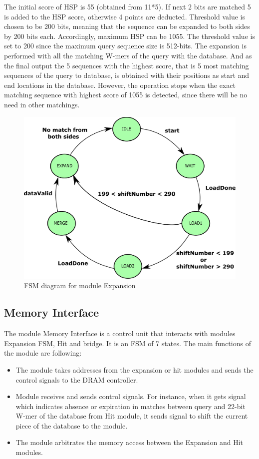 The initial score of HSP is 55 (obtained from 11*5). 
If next 2 bits are matched 5 is added to the HSP score, otherwise 4 points are deducted. 
Threshold value is chosen to be 200 bits, meaning that the sequence can be expanded to both sides by 200 bits each. 
Accordingly, maximum HSP can be 1055. 
The threshold value is set to 200 since the maximum query sequence size is 512-bits.
The expansion is performed with all the matching W-mers of the query with the database. And as the final output the 5 sequences with the highest score, that is 5 most matching sequences of the query to database, is obtained with their positions as start and end locations in the database. However, the operation stops when the exact matching sequence with highest score of 1055 is detected, since there will be no need in other matchings.
       

\begin{figure}[t!]
\centering
\includegraphics[width=\columnwidth]{Figures/expandFSM.pdf}
\caption{FSM diagram for module Expansion} \label{fig:expandFSM}
\end{figure}
       
       
\subsection{Memory Interface}
The module Memory Interface is a control unit that interacts with modules Expansion FSM, Hit and bridge. 
It is an FSM of 7 states. The main functions of the module are following:
\begin{itemize}
\item The module takes addresses from the expansion or hit modules and sends the control signals to the DRAM controller.
\item Module receives and sends control signals. For instance, when it gets signal which indicates absence or expiration in matches between query and 22-bit W-mer of the database from Hit module, it sends signal to shift the current piece of the database to the module.
\item The module arbitrates the memory access between the Expansion and Hit modules. 
\end{itemize}

